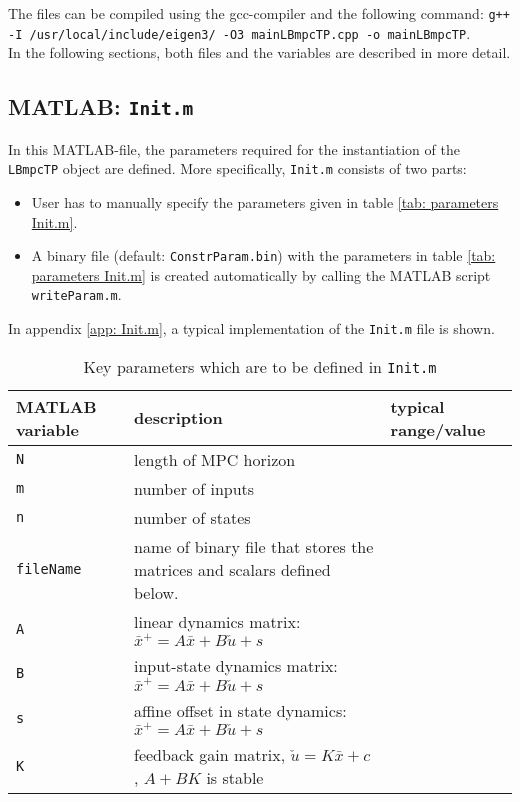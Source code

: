 \documentclass[letter]{article}
\begin{document}
\begin{sffamily}
\noindent
The files can be compiled using the gcc-compiler and the following command: \newline
\texttt{g++ -I /usr/local/include/eigen3/ -O3 mainLBmpcTP.cpp -o mainLBmpcTP}. \\


\noindent
In the following sections, both files and the variables are described in more detail.
\subsection{MATLAB: \texttt{Init.m}}
In this MATLAB-file, the parameters required for the instantiation of the \texttt{LBmpcTP} object are defined. More specifically, \texttt{Init.m} consists of two parts:
\begin{itemize}
	\item User has to manually specify the parameters given in table \ref{tab: parameters Init.m}.
	\item A binary file (default: \texttt{ConstrParam.bin}) with the parameters in table \ref{tab: parameters Init.m} is created automatically by calling the MATLAB script \texttt{writeParam.m}.
\end{itemize}
In appendix \ref{app: Init.m}, a typical implementation of the \texttt{Init.m} file is shown. \\

\begin{table}[!htdp]
\caption{Key parameters which are to be defined in \texttt{Init.m}}
\begin{center}
\begin{tabular}{|l|l|l|}\hline
{\bf MATLAB variable} & description & typical range/value \\ \hline\hline

 \texttt{N} & length of MPC horizon & \\ \hline
 \texttt{m} & number of inputs & \\ \hline
 \texttt{n} & number of states & \\ \hline \hline
 
 \texttt{fileName} & name of binary file that stores the matrices and scalars defined below. \\ \hline \hline
 
 \texttt{A} & linear dynamics matrix: $\bar{x}^+ = A\bar{x}+B\check{u}+s$ & \\ \hline
 \texttt{B} & input-state dynamics matrix: $\bar{x}^+ = A\bar{x}+B\check{u}+s$ & \\ \hline
 \texttt{s} & affine offset in state dynamics:  $\bar{x}^+ = A\bar{x}+B\check{u}+s$ & \\ \hline
 \texttt{K} & feedback gain matrix, $\check{u}=K\bar{x}+c$, $A+BK$ is stable & \\ \hline \hline
  

\end{tabular}
\end{center}
\end{table}
\end{sffamily}
\end{document}
